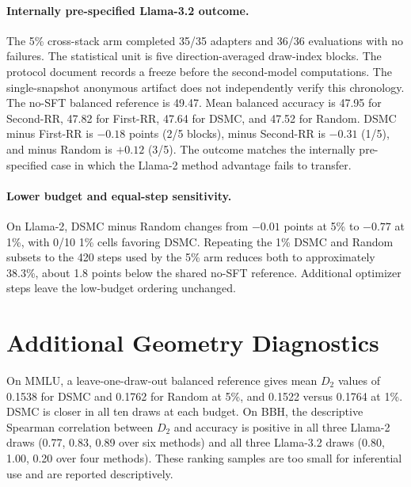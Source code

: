 \documentclass{article}
\newcommand{\method}{\textsc{DSMC}}
\newcommand{\dsecond}{D_2}
\begin{document}
\paragraph{Internally pre-specified Llama-3.2 outcome.}
The 5\% cross-stack arm completed 35/35 adapters and 36/36 evaluations with no
failures. The statistical unit is five direction-averaged draw-index blocks.
The protocol document records a freeze before the second-model computations.
The single-snapshot anonymous artifact does not independently verify this
chronology. The no-SFT balanced reference is 49.47. Mean balanced
accuracy is 47.95 for
Second-RR, 47.82 for First-RR, 47.64 for \method{}, and 47.52 for Random.
\method{} minus First-RR is $-0.18$ points (2/5 blocks), minus Second-RR is
$-0.31$ (1/5), and minus Random is $+0.12$ (3/5). The outcome matches the
internally pre-specified case in which the Llama-2 method advantage fails to
transfer.

\paragraph{Lower budget and equal-step sensitivity.}
On Llama-2, \method{} minus Random changes from $-0.01$ points at 5\% to
$-0.77$ at 1\%, with 0/10 1\% cells favoring \method{}. Repeating the 1\%
\method{} and Random subsets to the 420 steps used by the 5\% arm reduces both
to approximately 38.3\%, about 1.8 points below the shared no-SFT reference.
Additional optimizer steps leave the low-budget ordering unchanged.

\section{Additional Geometry Diagnostics}
\label{app:geometry}

On MMLU, a leave-one-draw-out balanced reference gives mean $\dsecond$ values
of 0.1538 for \method{} and 0.1762 for Random at 5\%, and 0.1522 versus
0.1764 at 1\%. \method{} is closer in all ten draws at each budget. On BBH,
the descriptive Spearman correlation between $\dsecond$ and accuracy is
positive in all three Llama-2 draws (0.77, 0.83, 0.89 over six methods) and all
three Llama-3.2 draws (0.80, 1.00, 0.20 over four methods). These ranking
samples are too small for inferential use and are reported descriptively.
\end{document}

